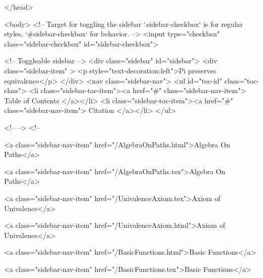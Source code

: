   
</head>




  <body>
    <!-- Target for toggling the sidebar `.sidebar-checkbox` is for regular
     styles, `#sidebar-checkbox` for behavior. -->
<input type="checkbox" class="sidebar-checkbox" id="sidebar-checkbox">

<!-- Toggleable sidebar -->
<div class="sidebar" id="sidebar">
  <div class="sidebar-item" >
    <p style="text-decoration:left">Pi preserves equivalence</p>
  </div>
  <nav class="sidebar-nav">
    <ul id="toc-id" class="toc-class">
  <li class="sidebar-toc-item"><a href="#" class="sidebar-nav-item"> Table of Contents </a></li>
  <li class="sidebar-toc-item"><a href="#" class="sidebar-nav-item"> Citation </a></li>
</ul>


    <!--  -->
    <!-- 
      
    
      
    
      
    
      
        
      
    
      
        
          <a class="sidebar-nav-item" href="/AlgebraOnPaths.html">Algebra On Paths</a>
        
      
    
      
        
          <a class="sidebar-nav-item" href="/AlgebraOnPaths.tex">Algebra On Paths</a>
        
      
    
      
        
          <a class="sidebar-nav-item" href="/UnivalenceAxiom.tex">Axiom of Univalence</a>
        
      
    
      
        
          <a class="sidebar-nav-item" href="/UnivalenceAxiom.html">Axiom of Univalence</a>
        
      
    
      
        
          <a class="sidebar-nav-item" href="/BasicFunctions.html">Basic Functions</a>
        
      
    
      
        
          <a class="sidebar-nav-item" href="/BasicFunctions.tex">Basic Functions</a>
        
      
    
      
        
